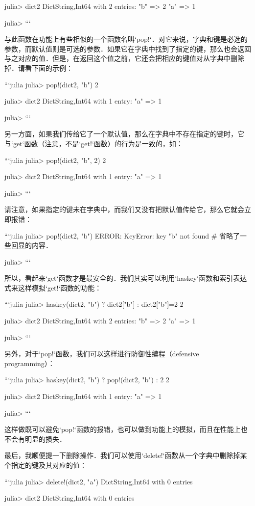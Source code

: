 julia> dict2
Dict{String,Int64} with 2 entries:
  "b" => 2
  "a" => 1

julia> 
```

与此函数在功能上有些相似的一个函数名叫`pop!`．对它来说，字典和键是必选的参数，而默认值则是可选的参数．如果它在字典中找到了指定的键，那么也会返回与之对应的值．但是，在返回这个值之前，它还会把相应的键值对从字典中删除掉．请看下面的示例：

```julia
julia> pop!(dict2, "b")
2

julia> dict2
Dict{String,Int64} with 1 entry:
  "a" => 1

julia> 
```

另一方面，如果我们传给它了一个默认值，那么在字典中不存在指定的键时，它与`get`函数（注意，不是`get!`函数）的行为是一致的，如：

```julia
julia> pop!(dict2, "b", 2)
2

julia> dict2
Dict{String,Int64} with 1 entry:
  "a" => 1

julia> 
```

请注意，如果指定的键未在字典中，而我们又没有把默认值传给它，那么它就会立即报错：

```julia
julia> pop!(dict2, "b")
ERROR: KeyError: key "b" not found
# 省略了一些回显的内容．

julia> 
```

所以，看起来`get`函数才是最安全的．我们其实可以利用`haskey`函数和索引表达式来这样模拟`get!`函数的功能：

```julia
julia> haskey(dict2, "b") ? dict2["b"] : dict2["b"]=2
2

julia> dict2
Dict{String,Int64} with 2 entries:
  "b" => 2
  "a" => 1

julia> 
```

另外，对于`pop!`函数，我们可以这样进行防御性编程（defensive programming）：

```julia
julia> haskey(dict2, "b") ? pop!(dict2, "b") : 2
2

julia> dict2
Dict{String,Int64} with 1 entry:
  "a" => 1

julia> 
```

这样做既可以避免`pop!`函数的报错，也可以做到功能上的模拟，而且在性能上也不会有明显的损失．

最后，我顺便提一下删除操作．我们可以使用`delete!`函数从一个字典中删除掉某个指定的键及其对应的值：

```julia
julia> delete!(dict2, "a")
Dict{String,Int64} with 0 entries

julia> dict2
Dict{String,Int64} with 0 entries


